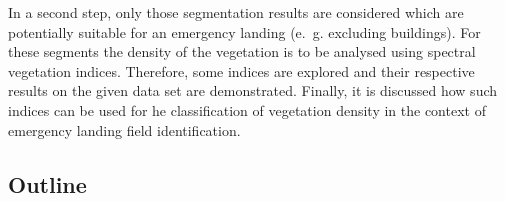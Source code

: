 In a second step, only those segmentation results are considered which are potentially suitable for an emergency landing (e.~g. excluding buildings). For these segments the density of the vegetation is to be analysed using spectral vegetation indices. Therefore, some indices are explored and their respective results on the given data set are demonstrated. Finally, it is discussed how such indices can be used for he classification of vegetation density in the context of emergency landing field identification.

\subsection{Outline}

\newpage